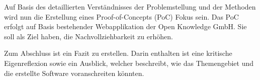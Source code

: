 Auf Basis des detaillierten Verständnisses der Problemstellung und der Methoden wird nun die Erstellung eines Proof-of-Concepts (PoC) Fokus sein. Das PoC erfolgt auf Basis bestehender Webapplikation der Open Knowledge GmbH. Sie soll als Ziel haben, die Nachvollziehbarkeit zu erhöhen.

Zum Abschluss ist ein Fazit zu erstellen. Darin enthalten ist eine kritische Eigenreflexion sowie ein Ausblick, welcher beschreibt, wie das Themengebiet und die erstellte Software voranschreiten könnten.






